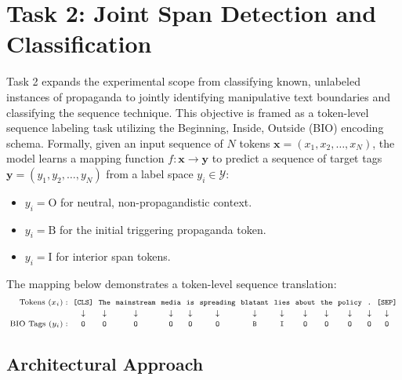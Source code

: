 \documentclass[12pt, a4paper]{article}
\begin{document}
\section{Task 2: Joint Span Detection and Classification}
\label{sec:task2}

Task 2 expands the experimental scope from classifying known, unlabeled instances of propaganda to jointly identifying manipulative text boundaries and classifying the sequence technique. This objective is framed as a token-level sequence labeling task utilizing the Beginning, Inside, Outside (BIO) encoding schema. Formally, given an input sequence of $N$ tokens $\mathbf{x} = (x_1, x_2, \dots, x_N)$, the model learns a mapping function $f: \mathbf{x} \rightarrow \mathbf{y}$ to predict a sequence of target tags $\mathbf{y} = (y_1, y_2, \dots, y_N)$ from a label space $y_i \in \mathcal{Y}$:
\begin{itemize}[leftmargin=*, noitemsep]
    \item $y_i = \text{O}$ for neutral, non-propagandistic context.
    \item $y_i = \text{B}$ for the initial triggering propaganda token.
    \item $y_i = \text{I}$ for interior span tokens.
\end{itemize}
The mapping below demonstrates a token-level sequence translation:
\[
\scriptsize
\setlength{\arraycolsep}{2.5pt} %
\begin{array}{rcccccccccccccc}
\text{Tokens } (x_i): & \texttt{[CLS]} & \texttt{The} & \texttt{mainstream} & \texttt{media} & \texttt{is} & \texttt{spreading} & \mathbf{\texttt{blatant}} & \mathbf{\texttt{lies}} & \texttt{about} & \texttt{the} & \texttt{policy} & \texttt{.} & \texttt{[SEP]} \\[2pt]
& \downarrow & \downarrow & \downarrow & \downarrow & \downarrow & \downarrow & \downarrow & \downarrow & \downarrow & \downarrow & \downarrow & \downarrow & \downarrow \\[2pt]
\text{BIO Tags } (y_i): & \texttt{O} & \texttt{O} & \texttt{O} & \texttt{O} & \texttt{O} & \texttt{O} & \mathbf{\texttt{B}} & \mathbf{\texttt{I}} & \texttt{O} & \texttt{O} & \texttt{O} & \texttt{O} & \texttt{O}
\end{array}
\]

\subsection{Architectural Approach}
\label{subsec:architectural_approach}
\end{document}
